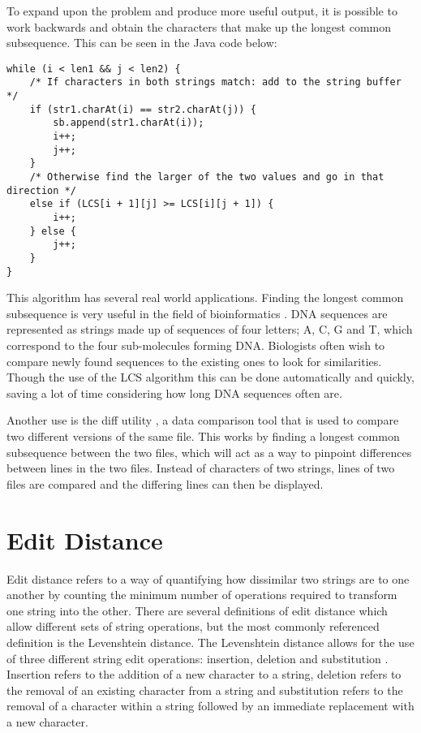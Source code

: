 To expand upon the problem and produce more useful output, it is possible to work backwards and obtain the characters that make up the longest common subsequence. This can be seen in the Java code below:

\begin{lstlisting}
while (i < len1 && j < len2) {
	/* If characters in both strings match: add to the string buffer */
	if (str1.charAt(i) == str2.charAt(j)) {
		sb.append(str1.charAt(i));
		i++;
		j++;
	}
	/* Otherwise find the larger of the two values and go in that direction */
	else if (LCS[i + 1][j] >= LCS[i][j + 1]) {
		i++;
	} else {
		j++;
	}
}
\end{lstlisting}

This algorithm has several real world applications. Finding the longest common subsequence is very useful in the field of bioinformatics \cite{bioinformatics}. DNA sequences are represented as strings made up of sequences of four letters; A, C, G and T, which correspond to the four sub-molecules forming DNA. Biologists often wish to compare newly found sequences to the existing ones to look for similarities. Though the use of the LCS algorithm this can be done automatically and quickly, saving a lot of time considering how long DNA sequences often are.

Another use is the diff utility \cite{diff-utility}, a data comparison tool that is used to compare two different versions of the same file. This works by finding a longest common subsequence between the two files, which will act as a way to pinpoint differences between lines in the two files. Instead of characters of two strings, lines of two files are compared and the differing lines can then be displayed.






\section{Edit Distance}

Edit distance refers to a way of quantifying how dissimilar two strings are to one another by counting the minimum number of operations required to transform one string into the other. There are several definitions of edit distance which allow different sets of string operations, but the most commonly referenced definition is the Levenshtein distance. The Levenshtein distance allows for the use of three different string edit operations: insertion, deletion and substitution \cite{Levenshtein}. Insertion refers to the addition of a new character to a string, deletion refers to the removal of an existing character from a string and substitution refers to the removal of a character within a string followed  by an immediate replacement with a new character.

